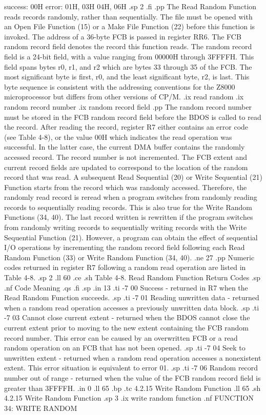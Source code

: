                                  success:  00H
                                   error:  01H, 03H
                                           04H, 06H
.sp 2
.fi
.pp
The Read Random Function reads records randomly, rather than
sequentially. The file must be opened with an Open File Function 
(15) or a Make File Function (22) before this function is 
invoked. The address of a 36-byte FCB is passed in register  RR6.
The FCB random record field denotes the record
this function reads. The random record field is a 24-bit field,
with a value ranging from 00000H through 3FFFFH. This field spans
bytes r0, r1, and r2 which are bytes 33 through 35 of the FCB. The
most significant byte is first, r0, and the least significant
byte, r2, is last. This byte sequence is consistent with the
addressing conventions for the Z8000 microprocessor but differs
from other versions of CP/M. 
.ix read random
.ix random record number
.ix random record field
.pp 
The random record number must be stored in the FCB random record
field before the BDOS is called to read the record.  After
reading the record, register   R7 either contains an error code
(see Table 4-8), or the value 00H which indicates the read operation
was successful.  In the latter case, the current DMA buffer
contains the randomly accessed record.  
The record number is not incremented. The FCB extent and current 
record fields are updated to correspond to the location of the 
random record that was read.  A subsequent Read Sequential (20)
or Write Sequential (21) Function starts from the record which was
randomly accessed. Therefore, the randomly read
record is reread when a program switches from randomly
reading records to sequentially reading records. This is also
true for the Write Random Functions (34, 40).  The last record written is
rewritten if the program switches from randomly writing records
to sequentially writing records with the Write Sequential 
Function (21). However, a program can obtain
the effect of sequential I/O operations by incrementing the random
record field following each Read Random Function (33) or Write Random 
Function (34, 40). 
.ne 27
.pp
Numeric codes returned in register   R7 following a random
read operation are listed in Table 4-8.
.sp 2
.ll 60
.ce
.sh
Table 4-8.  Read Random Function Return Codes
.sp
.nf
     Code                         Meaning
.qs
.fi
.sp
.in 13
.ti -7
00     Success - returned in   R7 when the Read Random Function 
succeeds.
.sp
.ti -7
01     Reading unwritten data -  returned when a random read operation
accesses a previously unwritten data block.
.sp
.ti -7
03     Cannot close current extent -  returned when the BDOS cannot
close the current extent prior to moving to the new extent
containing the FCB random record number.  This error can be
caused by an overwritten FCB or a read random operation on an FCB
that has not been opened. 
.sp
.ti -7
04     Seek to unwritten extent -  returned when a random read
operation accesses a nonexistent extent. This error situation is
equivalent to error 01. 
.sp
.ti -7
06     Random record number out of range -  returned when the value of 
the FCB random record field is greater than 3FFFFH.
.in 0
.ll 65
.bp
.tc         4.2.15  Write Random Function
.ll 65
.sh
4.2.15  Write Random Function
.sp 3
.ix write random function
.nf
                   FUNCTION 34:  WRITE RANDOM


